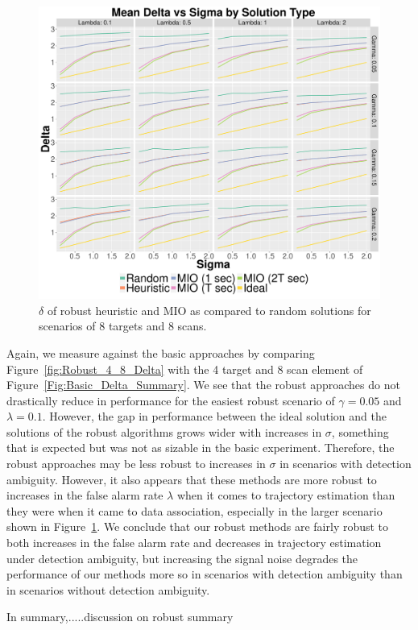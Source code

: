 \begin{figure}[ht]
  \centering
  \includegraphics[width=\columnwidth]{../Figures/8_8_Delta}
  \caption{$\delta$ of robust heuristic and MIO as compared to random solutions for scenarios of 8 targets and 8 scans.}
  \label{fig:Robust_8_8_Delta}
\end{figure}

Again, we measure against the basic approaches by comparing Figure~\ref{fig:Robust_4_8_Delta} with the 4 target and 8 scan element of Figure~\ref{Fig:Basic_Delta_Summary}. We see that the robust approaches do not drastically reduce in performance for the easiest robust scenario of $\gamma = 0.05$ and $\lambda = 0.1$. However, the gap in performance between the ideal solution and the solutions of the robust algorithms grows wider with increases in $\sigma$, something that is expected but was not as sizable in the basic experiment. Therefore, the robust approaches may be less robust to increases in $\sigma$ in scenarios with detection ambiguity. However, it also appears that these methods are more robust to increases in the false alarm rate $\lambda$ when it comes to trajectory estimation than they were when it came to data association, especially in the larger scenario shown in Figure~\ref{fig:Robust_8_8_Delta}. We conclude that our robust methods are fairly robust to both increases in the false alarm rate and decreases in trajectory estimation under detection ambiguity, but increasing the signal noise degrades the performance of our methods more so in scenarios with detection ambiguity than in scenarios without detection ambiguity.

In summary,.....discussion on robust summary


